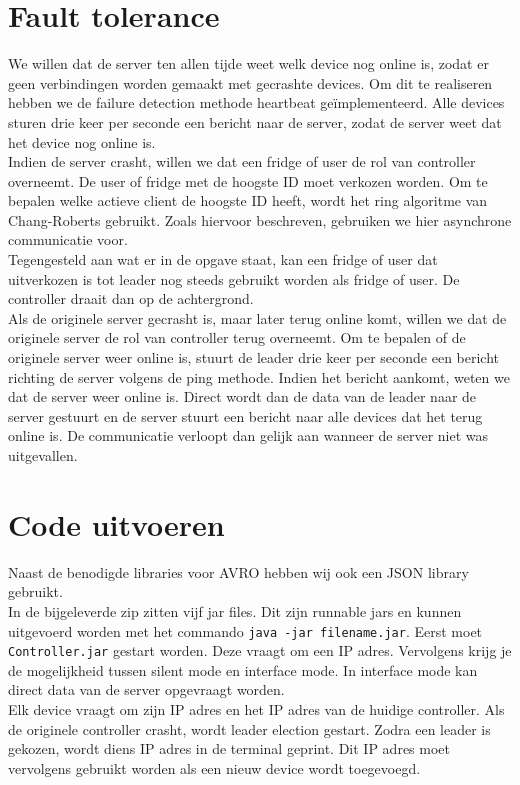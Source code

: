 \documentclass[a4paper]{article}
\begin{document}
	\section{Fault tolerance}
		We willen dat de server ten allen tijde weet welk device nog online is, zodat er geen verbindingen worden gemaakt met gecrashte devices. Om dit te realiseren hebben we de failure detection methode heartbeat ge\"implementeerd. Alle devices sturen drie keer per seconde een bericht naar de server, zodat de server weet dat het device nog online is. \\
		Indien de server crasht, willen we dat een fridge of user de rol van controller overneemt. De user of fridge met de hoogste ID moet verkozen worden. Om te bepalen welke actieve client de hoogste ID heeft, wordt het ring algoritme van Chang-Roberts gebruikt. Zoals hiervoor beschreven, gebruiken we hier asynchrone communicatie voor. \\
		Tegengesteld aan wat er in de opgave staat, kan een fridge of user dat uitverkozen is tot leader nog steeds gebruikt worden als fridge of user. De controller draait dan op de achtergrond. \\
		Als de originele server gecrasht is, maar later terug online komt, willen we dat de originele server de rol van controller terug overneemt. Om te bepalen of de originele server weer online is, stuurt de leader drie keer per seconde een bericht richting de server volgens de ping methode. Indien het bericht aankomt, weten we dat de server weer online is. Direct wordt dan de data van de leader naar de server gestuurt en de server stuurt een bericht naar alle devices dat het terug online is. De communicatie verloopt dan gelijk aan wanneer de server niet was uitgevallen.
		
	\section{Code uitvoeren}
		Naast de benodigde libraries voor AVRO hebben wij ook een JSON library gebruikt. \\
		In de bijgeleverde zip zitten vijf jar files. Dit zijn runnable jars en kunnen uitgevoerd worden met het commando \texttt{java -jar filename.jar}. Eerst moet \texttt{Controller.jar} gestart worden. Deze vraagt om een IP adres. Vervolgens krijg je de mogelijkheid tussen silent mode en interface mode. In interface mode kan direct data van de server opgevraagt worden. \\
		Elk device vraagt om zijn IP adres en het IP adres van de huidige controller. Als de originele controller crasht, wordt leader election gestart. Zodra een leader is gekozen, wordt diens IP adres in de terminal geprint. Dit IP adres moet vervolgens gebruikt worden als een nieuw device wordt toegevoegd. 
		
\end{document}
